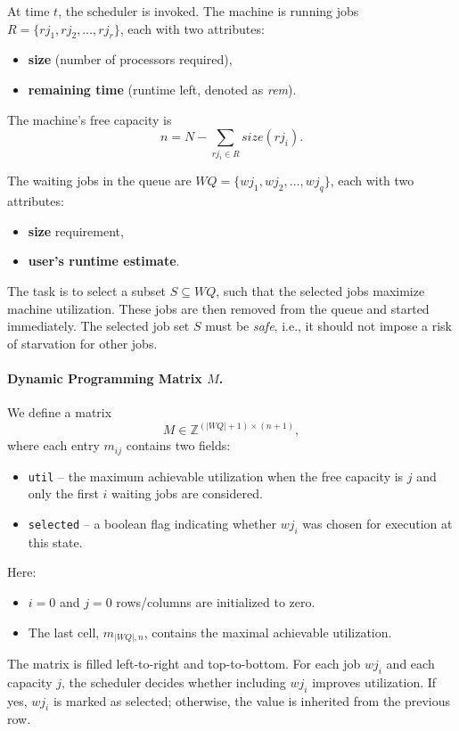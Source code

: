 \documentclass[12pt]{book}
\begin{document}
At time $t$, the scheduler is invoked. The machine is running jobs $R=\{rj_1, rj_2, \ldots, rj_r\}$, each with two attributes:
\begin{itemize}
    \item \textbf{size} (number of processors required),
    \item \textbf{remaining time} (runtime left, denoted as \emph{rem}).
\end{itemize}
The machine's free capacity is
\[
n = N - \sum_{rj_i \in R} size(rj_i).
\]

The waiting jobs in the queue are $WQ=\{wj_1, wj_2, \ldots, wj_q\}$, each with two attributes:
\begin{itemize}
    \item \textbf{size} requirement,
    \item \textbf{user's runtime estimate}.
\end{itemize}

The task is to select a subset $S \subseteq WQ$, such that the selected jobs maximize machine utilization. These jobs are then removed from the queue and started immediately. The selected job set $S$ must be \emph{safe}, i.e., it should not impose a risk of starvation for other jobs.

\paragraph{Dynamic Programming Matrix $M$.}
We define a matrix 
\[
M \in \mathbb{Z}^{(|WQ|+1)\times (n+1)},
\] 
where each entry $m_{ij}$ contains two fields:
\begin{itemize}
    \item \texttt{util} – the maximum achievable utilization when the free capacity is $j$ and only the first $i$ waiting jobs are considered.
    \item \texttt{selected} – a boolean flag indicating whether $wj_i$ was chosen for execution at this state.
\end{itemize}

Here:
\begin{itemize}
    \item $i=0$ and $j=0$ rows/columns are initialized to zero.
    \item The last cell, $m_{|WQ|,n}$, contains the maximal achievable utilization.
\end{itemize}

The matrix is filled left-to-right and top-to-bottom. For each job $wj_i$ and each capacity $j$, the scheduler decides whether including $wj_i$ improves utilization. If yes, $wj_i$ is marked as selected; otherwise, the value is inherited from the previous row.
\end{document}
